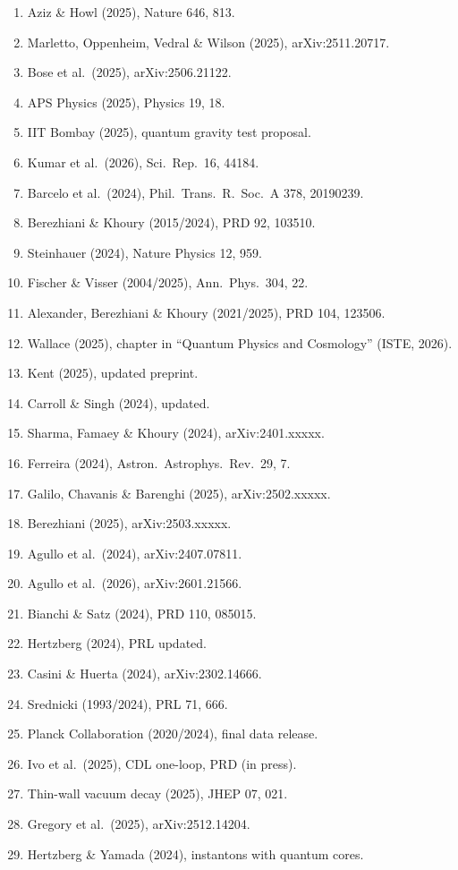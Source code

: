 \documentclass[11pt,a4paper]{article}
\begin{document}
\begin{enumerate}
\item Aziz \& Howl (2025), Nature 646, 813.
\item Marletto, Oppenheim, Vedral \& Wilson (2025), arXiv:2511.20717.
\item Bose et al.\ (2025), arXiv:2506.21122.
\item APS Physics (2025), Physics 19, 18.
\item IIT Bombay (2025), quantum gravity test proposal.
\item Kumar et al.\ (2026), Sci.\ Rep.\ 16, 44184.
\item Barcelo et al.\ (2024), Phil.\ Trans.\ R.\ Soc.\ A 378, 20190239.
\item Berezhiani \& Khoury (2015/2024), PRD 92, 103510.
\item Steinhauer (2024), Nature Physics 12, 959.
\item Fischer \& Visser (2004/2025), Ann.\ Phys.\ 304, 22.
\item Alexander, Berezhiani \& Khoury (2021/2025), PRD 104, 123506.
\item Wallace (2025), chapter in ``Quantum Physics and Cosmology'' (ISTE, 2026).
\item Kent (2025), updated preprint.
\item Carroll \& Singh (2024), updated.
\item Sharma, Famaey \& Khoury (2024), arXiv:2401.xxxxx.
\item Ferreira (2024), Astron.\ Astrophys.\ Rev.\ 29, 7.
\item Galilo, Chavanis \& Barenghi (2025), arXiv:2502.xxxxx.
\item Berezhiani (2025), arXiv:2503.xxxxx.
\item Agullo et al.\ (2024), arXiv:2407.07811.
\item Agullo et al.\ (2026), arXiv:2601.21566.
\item Bianchi \& Satz (2024), PRD 110, 085015.
\item Hertzberg (2024), PRL updated.
\item Casini \& Huerta (2024), arXiv:2302.14666.
\item Srednicki (1993/2024), PRL 71, 666.
\item Planck Collaboration (2020/2024), final data release.
\item Ivo et al.\ (2025), CDL one-loop, PRD (in press).
\item Thin-wall vacuum decay (2025), JHEP 07, 021.
\item Gregory et al.\ (2025), arXiv:2512.14204.
\item Hertzberg \& Yamada (2024), instantons with quantum cores.

\end{enumerate}
\end{document}
